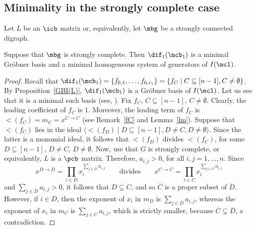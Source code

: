\subsection{Minimality in the strongly complete case}

 Let $L$ be an $\icb$ matrix or, equivalently, let $\mbg$ be
a strongly connected digraph.

\begin{proposition}\label{minGB}
Suppose that $\mbg$ is strongly complete. Then $\dif_1(\mcb_1)$ is a
minimal Gr\"obner basis and a minimal homogeneous system of generators
of $I(\mcl)$.
\end{proposition}
\begin{proof}
Recall that $\dif_1(\mcb_1)=\{f_{0,1},\ldots ,f_{0,r_1}\}=\{f_C\mid
C\subseteq [n-1], C\neq\emptyset \}$. By Proposition~\ref{GBI(L)},
$\dif_1(\mcb_1)$ is a Gr\"obner basis of $I(\mcl)$. Let us see that it
is a minimal such basis (see, \eg
\cite[\S~2.7. Definition~4]{clo}). Fix $f_C$, $C\subseteq [n-1]$,
$C\neq\emptyset$. Clearly, the leading coefficient of $f_C$ is
$1$. Moreover, the leading term of $f_C$ is
$\lt(f_C)=m_C=x^{C\to\overline{C}}$ (see Remark~\ref{fC} and
Lemma~\ref{lm}). Suppose that $\lt(f_C)$ lies in the ideal
$\langle\lt(f_D)\mid D\subseteq [n-1], D\neq C, D\neq
\emptyset\rangle$. Since the latter is a monomial ideal, it follows
that $\lt(f_D)$ divides $\lt(f_C)$, for some $D\subseteq [n-1]$,
$D\neq C$, $D\neq\emptyset$. Now, use that $G$ is strongly complete,
or equivalently, $L$ is a $\pcb$ matrix. Therefore, $a_{i,j}>0$, for
all $i,j=1,\ldots ,n$. Since
\[
x^{D\to\overline{D}}=\prod_{i\in
  D}x_i^{\sum_{j\in\overline{D}}a_{i,j}}\qquad\text{divides}\qquad
x^{C\to\overline{C}}=\prod_{i\in
  C}x_i^{\sum_{j\in\overline{C}}a_{i,j}}
\]
and $\sum_{j\in\overline{D}}a_{i,j}>0$, it follows that $D\subsetneq C$,
and so $\overline{C}$ is a proper subset of $\overline{D}$. However,
if $i\in D$, then the exponent of $x_i$ in $m_D$ is
$\sum_{j\in\overline{D}}a_{i,j}$, whereas the exponent of $x_i$ in
$m_C$ is $\sum_{j\in\overline{C}}a_{i,j}$, which is strictly smaller,
because $\overline{C}\subsetneq \overline{D}$, a contradiction.


\end{proof}
